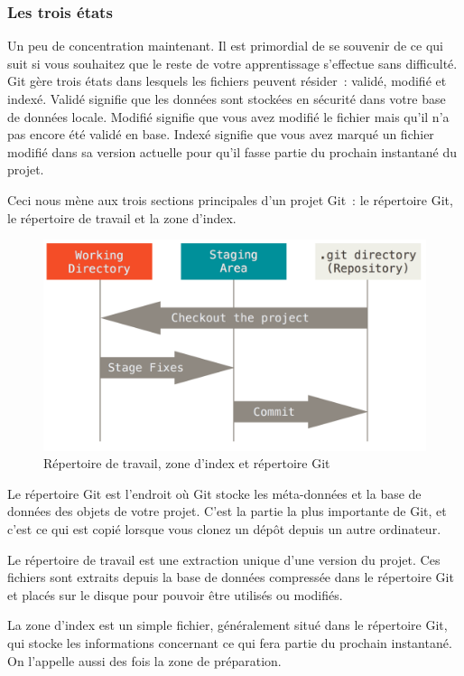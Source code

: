\subsubsection{Les trois états}

Un peu de concentration maintenant.
Il est primordial de se souvenir de ce qui suit si vous souhaitez que le reste de votre apprentissage s'effectue sans difficulté.
Git gère trois états dans lesquels les fichiers peuvent résider : validé, modifié et indexé.
Validé signifie que les données sont stockées en sécurité dans votre base de données locale.
Modifié signifie que vous avez modifié le fichier mais qu'il n'a pas encore été validé en base.
Indexé signifie que vous avez marqué un fichier modifié dans sa version actuelle pour qu'il fasse partie du prochain instantané du projet.

Ceci nous mène aux trois sections principales d'un projet Git : le répertoire Git, le répertoire de travail et la zone d'index.

\begin{figure}[!h]
  \centering
  \includegraphics{images/areas}
  \caption{Répertoire de travail, zone d'index et répertoire Git}
  \label{fig:git:areas}
\end{figure}

Le répertoire Git est l'endroit où Git stocke les méta-données et la base de données des objets de votre projet.
C'est la partie la plus importante de Git, et c'est ce qui est copié lorsque vous clonez un dépôt depuis un autre ordinateur.

Le répertoire de travail est une extraction unique d'une version du projet.
Ces fichiers sont extraits depuis la base de données compressée dans le répertoire Git et placés sur le disque pour pouvoir être utilisés ou modifiés.

La zone d'index est un simple fichier, généralement situé dans le répertoire Git, qui stocke les informations concernant ce qui fera partie du prochain instantané. On l'appelle aussi des fois la zone de préparation.

